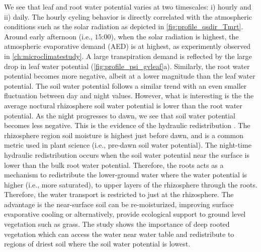 We see that leaf and root water potential varies at two timescales: i) hourly and ii) daily. The hourly cycling behavior is directly correlated with the atmospheric conditions such as the solar radiation as depicted in \cref{fig:profile_qsdir_Tmrt}. Around early afternoon (i.e., $15$:$00$), when the solar radiation is highest, the atmospheric evaporative demand (AED) is at highest, as experimently observed in \cref{ch:microclimatestudy}. A large transpiration demand is reflected by the large drop in leaf water potential (\cref{fig:profile_psi_gvleaf}a). Similarly, the root water potential becomes more negative, albeit at a lower magnitude than the leaf water potential. The soil water potential follows a similar trend with an even smaller fluctuation between day and night values. However, what is interesting is the the average noctural rhizosphere soil water potential is lower than the root water potential. As the night progresses to dawn, we see that soil water potential becomes less negative. This is the evidence of the hydraulic redistribution \citep{Volpe2013, Huang2017}. The rhizosphere region soil moisture is highest just before dawn, and is a common metric used in plant science (i.e., pre-dawn soil water potential). The night-time hydraulic redistribution occurs when the soil water potential near the surface is lower than the bulk root water potential. Therefore, the roots acts as a mechanism to redistribute the lower-ground water where the water potential is higher (i.e., more saturated), to upper layers of the rhizosphere through the roots. Therefore, the water transport is restricted to just at the rhizosphere. The advantage is the near-surface soil can be re-moisturized, improving surface evaporative cooling or alternatively, provide ecological support to ground level vegetation such as grass. The study shows the importance of deep rooted vegetation which can access the water near water table and redistribute to regions of driest soil where the soil water potential is lowest.

